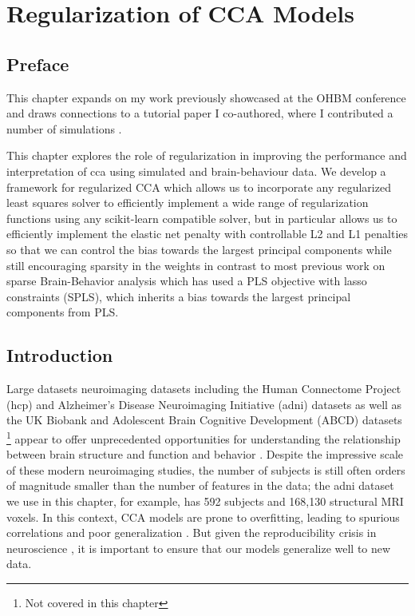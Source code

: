 \graphicspath{{chapters/regularization}}


\chapter{Regularization of CCA Models}\label{chap:als}
\minitoc
\section*{Preface}

This chapter expands on my work previously showcased at the OHBM conference and draws connections to a tutorial paper I co-authored, where I contributed a number of simulations \citep{mihalik2022canonical}.

This chapter explores the role of regularization in improving the performance and interpretation of \acrshort{cca} using simulated and brain-behaviour data.
We develop a framework for regularized CCA which allows us to incorporate any regularized least squares solver to efficiently implement a wide range of regularization functions using any scikit-learn compatible solver, but in particular allows us to efficiently implement the elastic net penalty with controllable L2 and L1 penalties so that we can control the bias towards the largest principal components while still encouraging sparsity in the weights in contrast to most previous work on sparse Brain-Behavior analysis which has used a PLS objective with lasso constraints (SPLS), which inherits a bias towards the largest principal components from PLS.


\section{Introduction}\label{sec:introduction}

Large datasets neuroimaging datasets including the Human Connectome Project (\acrshort{hcp}) and Alzheimer's Disease Neuroimaging Initiative (\acrshort{adni}) datasets as well as the UK Biobank and Adolescent Brain Cognitive Development (ABCD) datasets \footnote{Not covered in this chapter} appear to offer unprecedented opportunities for understanding the relationship between brain structure and function and behavior \citep{SMITH2018263,BZDOK2017549,wang2020finding}.
Despite the impressive scale of these modern neuroimaging studies, the number of subjects is still often orders of magnitude smaller than the number of features in the data; the \acrshort{adni} dataset we use in this chapter, for example, has 592 subjects and 168,130 structural MRI voxels.
In this context, CCA models are prone to overfitting, leading to spurious correlations and poor generalization \citep{helmer2020stability,mihalik2020multiple}.
But given the reproducibility crisis in neuroscience \citep{button2013power}, it is important to ensure that our models generalize well to new data.

